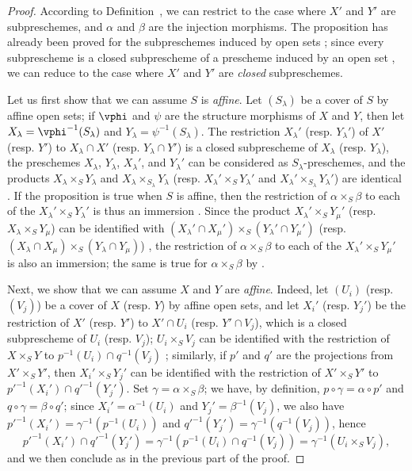 \begin{proof}
According to Definition~, we can restrict to the case where $X'$ and $Y'$ are subpreschemes, and $\alpha$ and $\beta$ are the injection morphisms.
The proposition has already been proved for the subpreschemes induced by open sets ;
since every subprescheme is a closed subprescheme of a prescheme induced by an open set , we can reduce to the case where $X'$ and $Y'$ are \emph{closed} subpreschemes.

Let us first show that we can assume $S$ is \emph{affine}.
Let $(S_\lambda)$ be a cover of $S$ by affine open sets;
if $\vphi$ and $\psi$ are the structure morphisms of $X$ and $Y$, then let $X_\lambda=\vphi^{-1}(S_\lambda)$ and $Y_\lambda=\psi^{-1}(S_\lambda)$.
The restriction $X_\lambda'$ (resp. $Y_\lambda'$) of $X'$ (resp. $Y'$) to $X_\lambda\cap X'$ (resp. $Y_\lambda\cap Y'$) is a closed subprescheme of $X_\lambda$ (resp. $Y_\lambda$), the preschemes $X_\lambda$, $Y_\lambda$, $X_\lambda'$, and $Y_\lambda'$ can be considered as $S_\lambda$-preschemes, and the products $X_\lambda\times_S Y_\lambda$ and $X_\lambda\times_{S_\lambda}Y_\lambda$ (resp. $X_\lambda'\times_S Y_\lambda'$ and $X_\lambda'\times_{S_\lambda}Y_\lambda'$) are identical .
If the proposition is true when $S$ is affine, then the restriction of $\alpha\times_S\beta$ to each of the $X_\lambda'\times_S Y_\lambda'$ is thus an immersion .
Since the product $X_\lambda'\times_S Y_\mu'$ (resp. $X_\lambda\times_S Y_\mu$) can be identified with $(X_\lambda'\cap X_\mu')\times_S(Y_\lambda'\cap Y_\mu')$ (resp. $(X_\lambda\cap X_\mu)\times_S(Y_\lambda\cap Y_\mu)$) , the restriction of $\alpha\times_S\beta$
to each of the $X_\lambda'\times_S Y_\mu'$ is also an immersion;
the same is true for $\alpha\times_S\beta$ by .

Next, we show that we can assume $X$ and $Y$ are \emph{affine}.
Indeed, let $(U_i)$ (resp. $(V_j)$) be a cover of $X$ (resp. $Y$) by affine open sets, and let $X_i'$ (resp. $Y_j'$) be the restriction of $X'$ (resp. $Y'$) to $X'\cap U_i$ (resp. $Y'\cap V_j$), which is a closed subprescheme of $U_i$ (resp. $V_j$);
$U_i\times_S V_j$ can be identified with the restriction of $X\times_S Y$ to $p^{-1}(U_i)\cap q^{-1}(V_j)$ ;
similarly, if $p'$ and $q'$ are the projections from $X'\times_S Y'$, then $X_i'\times_S Y_j'$ can be identified with the restriction of $X'\times_S Y'$ to ${p'}^{-1}(X_i')\cap{q'}^{-1}(Y_j')$.
Set $\gamma=\alpha\times_S\beta$;
we have, by definition, $p\circ\gamma=\alpha\circ p'$ and $q\circ\gamma=\beta\circ q'$;
since $X_i'=\alpha^{-1}(U_i)$ and $Y_j'=\beta^{-1}(V_j)$, we also have ${p'}^{-1}(X_i')=\gamma^{-1}(p^{-1}(U_i))$ and ${q'}^{-1}(Y_j')=\gamma^{-1}(q^{-1}(V_j))$, hence
\[
  {p'}^{-1}(X_i')\cap{q'}^{-1}(Y_j')=\gamma^{-1}(p^{-1}(U_i)\cap q^{-1}(V_j))=\gamma^{-1}(U_i\times_S V_j),
\]
and we then conclude as in the previous part of the proof.


\end{proof}
